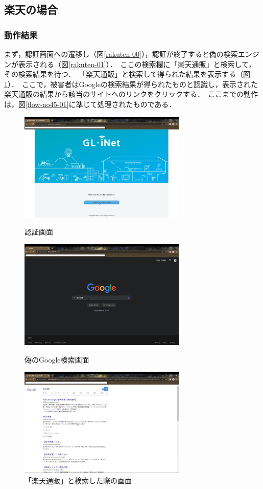 \documentclass[dvipdfmx,twocolumn,9pt]{jsarticle}
\begin{document}
        \subsection{楽天の場合}
            \subsubsection{動作結果}
                まず，認証画面への遷移し（図\ref{rakuten-00}），認証が終了すると偽の検索エンジンが表示される（図\ref{rakuten-01}）．\
                ここの検索欄に「楽天通販」と検索して，その検索結果を待つ．\
                「楽天通販」と検索して得られた結果を表示する（図\ref{rakuten-02}）．\
                ここで，被害者はGoogleの検索結果が得られたものと認識し，表示された楽天通販の結果から該当のサイトへのリンクをクリックする．\
                ここまでの動作は，図\ref{flow-no45-01}に準じて処理されたものである．\
                \begin{figure}[h]
                    \centering
                    \includegraphics[width=8cm]{img/rakuten/rakuten-00.png}
                    \caption{認証画面}
                    \label{rakuten-00}
                    \includegraphics[width=8cm]{img/rakuten/rakuten-01.png}
                    \caption{偽のGoogle検索画面}
                    \label{rakuten-01}
                    \includegraphics[width=8cm]{img/rakuten/rakuten-02.png}
                    \caption{「楽天通販」と検索した際の画面}
                    \label{rakuten-02}
                \end{figure}
\end{document}
